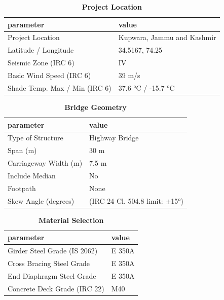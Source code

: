 \documentclass[12pt,a4paper]{report}
\numberwithin{table}{chapter}
\numberwithin{figure}{chapter}
\begin{document}
\begin{table}[H]
\caption{\textbf{Project Location}}
\label{subsec:project-location}
\begin{tabular}{|L{5.5cm}|L{8.5cm}|}
\hline
\textbf{parameter} & \textbf{value} \\
\hline
\textnormal{Project Location} & Kupwara, Jammu and Kashmir \\
\hline
\textnormal{Latitude / Longitude} & 34.5167, 74.25 \\
\hline
\textnormal{Seismic Zone (IRC 6)} & IV \\
\hline
\textnormal{Basic Wind Speed (IRC 6)} & 39 m/s \\
\hline
\textnormal{Shade Temp. Max / Min (IRC 6)} & 37.6 °C / -15.7 °C \\
\hline
\end{tabular}
\vspace{0.4cm}
\end{table}

\begin{table}[H]
\caption{\textbf{Bridge Geometry}}
\label{subsec:bridge-geometry}
\begin{tabular}{|L{5.5cm}|L{8.5cm}|}
\hline
\textbf{parameter} & \textbf{value} \\
\hline
\textnormal{Type of Structure} & Highway Bridge \\
\hline
\textnormal{Span (m)} & 30 m \\
\hline
\textnormal{Carriageway Width (m)} & 7.5 m \\
\hline
\textnormal{Include Median} & No \\
\hline
\textnormal{Footpath} & None \\
\hline
\textnormal{Skew Angle (degrees)} &  (IRC 24 Cl. 504.8 limit: $\pm$15°) \\
\hline
\end{tabular}
\end{table}
\vspace{0.4cm}

\begin{table}[H]
\caption{\textbf{Material Selection}}
\label{subsec:material}
\begin{tabular}{|L{5.5cm}|L{8.5cm}|}
\hline
\textbf{parameter} & \textbf{value} \\
\hline
\textnormal{Girder Steel Grade (IS 2062)} & E 350A \\
\hline
\textnormal{Cross Bracing Steel Grade} & E 350A \\
\hline
\textnormal{End Diaphragm Steel Grade} & E 350A \\
\hline
\textnormal{Concrete Deck Grade (IRC 22)} & M40 \\
\hline
\end{tabular}
\end{table}
\vspace{0.4cm}
\end{document}
